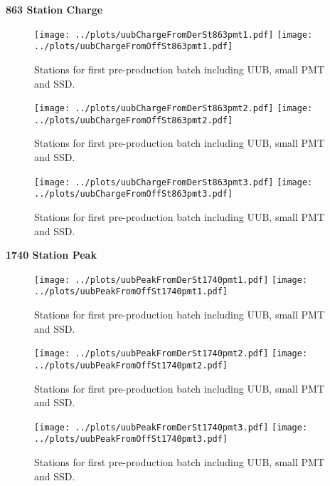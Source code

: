 \documentclass[twoside, final, 10pt]{articleMine}
\begin{document}
{\bf 863 Station Charge}

\begin{figure}[!tbh]
  \centering
  \subfigure
  {
    \texttt{[image: ../plots/uubChargeFromDerSt863pmt1.pdf]}
    \texttt{[image: ../plots/uubChargeFromOffSt863pmt1.pdf]}
  }
  \caption{Stations for first pre-production batch including UUB, small PMT and SSD.}
  \label{figChLowHigh}
\end{figure}

\begin{figure}[!tbh]
  \centering
  \subfigure
  {
    \texttt{[image: ../plots/uubChargeFromDerSt863pmt2.pdf]}
    \texttt{[image: ../plots/uubChargeFromOffSt863pmt2.pdf]}
  }
  \caption{Stations for first pre-production batch including UUB, small PMT and SSD.}
  \label{figChLowHigh}
\end{figure}

\begin{figure}[!tbh]
  \centering
  \subfigure
  {
    \texttt{[image: ../plots/uubChargeFromDerSt863pmt3.pdf]}
    \texttt{[image: ../plots/uubChargeFromOffSt863pmt3.pdf]}
  }
  \caption{Stations for first pre-production batch including UUB, small PMT and SSD.}
  \label{figChLowHigh}
\end{figure}
\clearpage

{\bf 1740 Station Peak}
\begin{figure}[!tbh]
  \centering
  \subfigure
  {
    \texttt{[image: ../plots/uubPeakFromDerSt1740pmt1.pdf]}
    \texttt{[image: ../plots/uubPeakFromOffSt1740pmt1.pdf]}
  }
  \caption{Stations for first pre-production batch including UUB, small PMT and SSD.}
  \label{figChLowHigh}
\end{figure}

\begin{figure}[!tbh]
  \centering
  \subfigure
  {
    \texttt{[image: ../plots/uubPeakFromDerSt1740pmt2.pdf]}
    \texttt{[image: ../plots/uubPeakFromOffSt1740pmt2.pdf]}
  }
  \caption{Stations for first pre-production batch including UUB, small PMT and SSD.}
  \label{figChLowHigh}
\end{figure}

\begin{figure}[!tbh]
  \centering
  \subfigure
  {
    \texttt{[image: ../plots/uubPeakFromDerSt1740pmt3.pdf]}
    \texttt{[image: ../plots/uubPeakFromOffSt1740pmt3.pdf]}
  }
  \caption{Stations for first pre-production batch including UUB, small PMT and SSD.}
  \label{figChLowHigh}
\end{figure}
\clearpage
\end{document}
